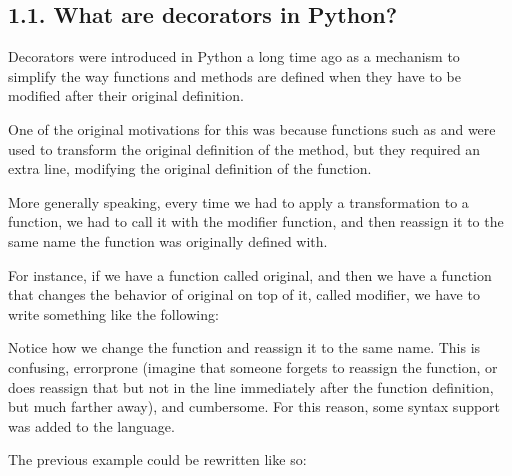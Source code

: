 \documentclass[a4paper,10pt,english]{sphinxmanual}
\begin{document}
\subsection{1.1. What are decorators in Python?}
\label{\detokenize{chapters/5_decorators/index:what-are-decorators-in-python}}
Decorators were introduced in Python a long time ago as a mechanism to
simplify the way functions and methods are defined when they have to be modified after
their original definition.

One of the original motivations for this was because functions such as  and
 were used to transform the original definition of the method, but they
required an extra line, modifying the original definition of the function.

More generally speaking, every time we had to apply a transformation to a function, we
had to call it with the modifier function, and then reassign it to the same name the
function was originally defined with.

For instance, if we have a function called original, and then we have a function that
changes the behavior of original on top of it, called modifier, we have to write
something like the following:

\begin{sphinxVerbatim}[commandchars=\\\{\}]
 

  
\end{sphinxVerbatim}

Notice how we change the function and reassign it to the same name. This is confusing,
error\sphinxhyphen{}prone (imagine that someone forgets to reassign the function, or does reassign that
but not in the line immediately after the function definition, but much farther away), and
cumbersome. For this reason, some syntax support was added to the language.

The previous example could be rewritten like so:

\begin{sphinxVerbatim}[commandchars=\\\{\}]
 
\end{sphinxVerbatim}
\end{document}
